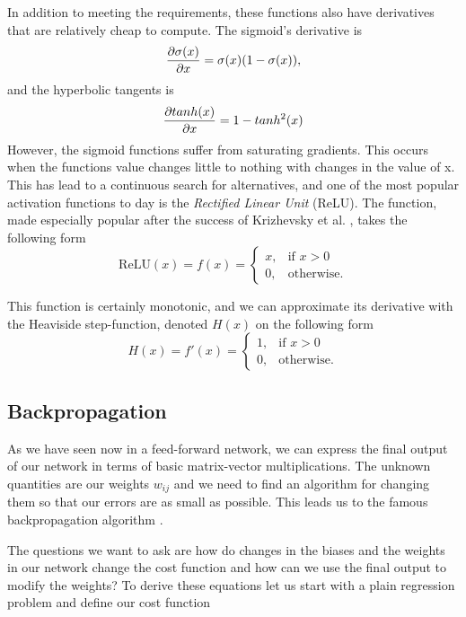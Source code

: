 \noindent In addition to meeting the requirements, these functions also have derivatives that are relatively cheap
to compute. The sigmoid's derivative is
\begin{equation}
	{\frac{\partial \sigma(x)}{\partial x}} = \sigma(x)(1-\sigma(x)),
\end{equation}
and the hyperbolic tangents is
\begin{equation}
	{\frac{\partial tanh(x)}{\partial x}} = 1 - tanh^2(x)
\end{equation}
However, the sigmoid functions suffer from saturating gradients. This occurs when the functions value
changes little to nothing with changes in the value of x. This has lead to a continuous search for
alternatives, and one of the most popular activation functions to day is the \textit{Rectified Linear Unit} (ReLU).
The function, made especially popular after the success of Krizhevsky et al. \cite{Krizhevsky2012},
takes the following form
\begin{equation}\label{eq:relu}
	\text{ReLU} (x) = f(x) = \begin{cases}
	x, & \text{if } x > 0 \\
	0,  & \text{otherwise} .
	\end{cases}
\end{equation}

\noindent This function is certainly monotonic, and we can approximate its derivative with the Heaviside
step-function, denoted $H(x)$ on the following form
\begin{equation}\label{eq:heaviside}
	H(x) = f'(x) = 	\begin{cases}1, & \text{if } x > 0 \\
		0,  & \text{otherwise}.
	\end{cases}
\end{equation}

\subsection{Backpropagation}

As we have seen now in a feed-forward network, we can express the final output of our 
network in terms of basic matrix-vector multiplications. The unknown quantities are 
our weights $w_{ij}$ and we need to find an algorithm for changing them so that our 
errors are as small as possible. This leads us to the famous backpropagation algorithm
\cite{Rumelhart1986}.

The questions we want to ask are how do changes in the biases and the
weights in our network change the cost function and how can we use the
final output to modify the weights?
To derive these equations let us start with a plain regression problem
and define our cost function 

